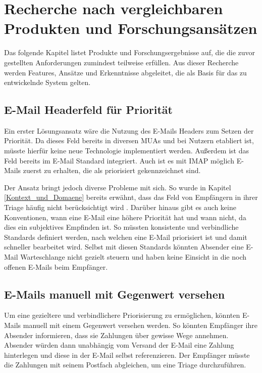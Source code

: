 
\chapter{Recherche nach vergleichbaren Produkten und Forschungsansätzen}
\label{Recherche_nach_vergleichbaren_Produkten_und_Forschungen}

Das folgende Kapitel listet Produkte und Forschungsergebnisse auf, die die zuvor gestellten Anforderungen zumindest teilweise erfüllen. Aus dieser Recherche werden Features, Ansätze und Erkenntnisse abgeleitet, die als Basis für das zu entwickelnde System gelten.

\section{E-Mail Headerfeld für Priorität}
Ein erster Lösungsansatz wäre die Nutzung des E-Mails Headers zum Setzen der Priorität. Da dieses Feld bereits in diversen MUAs und bei Nutzern etabliert ist, müsste hierfür keine neue Technologie implementiert werden. Außerdem ist das Feld bereits im E-Mail Standard integriert. Auch ist es mit IMAP möglich E-Mails zuerst zu erhalten, die als priorisiert gekennzeichnet sind.

Der Ansatz bringt jedoch diverse Probleme mit sich. So wurde in Kapitel \ref{Kontext_und_Domaene} bereits erwähnt, dass das Feld von Empfängern in ihrer Triage häufig nicht berücksichtigt wird \citep[S. 279 f.]{Whittaker1996}. Darüber hinaus gibt es auch keine Konventionen, wann eine E-Mail eine höhere Priorität hat und wann nicht, da dies ein subjektives Empfinden ist. So müssten konsistente und verbindliche Standards definiert werden, nach welchen eine E-Mail priorisiert ist und damit schneller bearbeitet wird. Selbst mit diesen Standards könnten Absender eine E-Mail Warteschlange nicht gezielt steuern und haben keine Einsicht in die noch offenen E-Mails beim Empfänger.

\section{E-Mails manuell mit Gegenwert versehen}
Um eine gezieltere und verbindlichere Priorisierung zu ermöglichen, könnten E-Mails manuell mit einem Gegenwert versehen werden. So könnten Empfänger ihre Absender informieren, dass sie Zahlungen über gewisse Wege annehmen. Absender würden dann unabhängig vom Versand der E-Mail eine Zahlung hinterlegen und diese in der E-Mail selbst referenzieren. Der Empfänger müsste die Zahlungen mit seinem Postfach abgleichen, um eine Triage durchzuführen.

